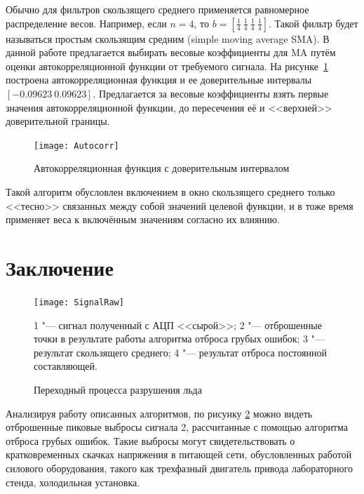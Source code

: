 	Обычно для фильтров скользящего среднего применяется равномерное распределение весов. Например, если $ n = 4 $, то $ b = \left[ \frac{1}{4}\ \frac{1}{4}\ \frac{1}{4}\ \frac{1}{4}\right] $. Такой фильтр будет называться простым скользящим средним (simple moving average SMA).
	В данной работе предлагается выбирать весовые коэффициенты для MA путём оценки автокорреляционной функции от требуемого сигнала. На рисунке~\ref{fig:Autocorr} построена автокорреляционная функция и ее доверительные интервалы $ [-0.09623\ 0.09623] $. Предлагается за весовые коэффициенты взять первые значения автокорреляционной функции, до пересечения её и <<верхней>> доверительной границы.

	\begin{figure}[ht] 
		\centering
		\texttt{[image: Autocorr]}
		\caption{Автокорреляционная функция с доверительным интервалом} 
		\label{fig:Autocorr}  
	\end{figure}

	Такой алгоритм обусловлен включением в окно скользящего среднего только <<тесно>> связанных между собой значений целевой функции, и в тоже время применяет веса к включённым значениям согласно их влиянию.

	\section{Заключение}

	\begin{figure}[ht] 
		\centering
		\texttt{[image: SignalRaw]}
		
		1 "--- сигнал полученный с АЦП <<сырой>>; 2 "--- отброшенные точки в результате работы алгоритма отброса грубых ошибок; 3 "--- результат скользящего среднего; 4 "--- результат отброса постоянной составляющей.
		\caption{Переходный процесса разрушения льда} 
		\label{fig:SignalRaw}  
	\end{figure}

	Анализируя работу описанных алгоритмов, по рисунку \ref{fig:SignalRaw} можно видеть отброшенные пиковые выбросы сигнала 2, рассчитанные с помощью алгоритма отброса грубых ошибок. Такие выбросы могут свидетельствовать о кратковременных скачках напряжения в питающей сети, обусловленных работой силового оборудования, такого как трехфазный двигатель привода лабораторного стенда, холодильная установка.

